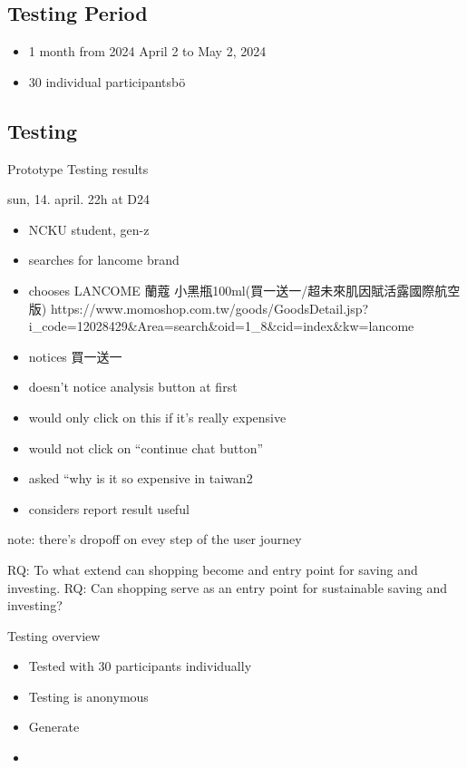 \documentclass[
  letterpaper,
  DIV=11,
  numbers=noendperiod]{scrartcl}
\providecommand{\tightlist}{%
  \setlength{\itemsep}{0pt}\setlength{\parskip}{0pt}}\usepackage{longtable,booktabs,array}
\begin{document}
\subsection{Testing Period}\label{testing-period}

\begin{itemize}
\tightlist
\item
  1 month from 2024 April 2 to May 2, 2024
\item
  30 individual participantsbö
\end{itemize}

\subsection{Testing}\label{testing-2}

Prototype Testing results

sun, 14. april. 22h at D24

\begin{itemize}
\tightlist
\item
  NCKU student, gen-z
\item
  searches for lancome brand
\item
  chooses LANCOME 蘭蔻 小黑瓶100ml(買一送一/超未來肌因賦活露國際航空版)
  https://www.momoshop.com.tw/goods/GoodsDetail.jsp?i\_code=12028429\&Area=search\&oid=1\_8\&cid=index\&kw=lancome
\item
  notices 買一送一
\item
  doesn't notice analysis button at first
\item
  would only click on this if it's really expensive
\item
  would not click on ``continue chat button''
\item
  asked ``why is it so expensive in taiwan2
\item
  considers report result useful
\end{itemize}

note: there's dropoff on evey step of the user journey

RQ: To what extend can shopping become and entry point for saving and
investing. RQ: Can shopping serve as an entry point for sustainable
saving and investing?

Testing overview

\begin{itemize}
\tightlist
\item
  Tested with 30 participants individually
\item
  Testing is anonymous
\item
  Generate
\item
\end{itemize}
\end{document}
